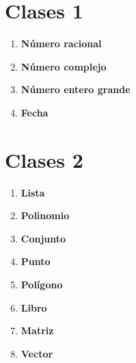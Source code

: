 \section{Clases 1}
\begin{enumerate}
    \item \textbf{Número racional}\\
    

    \item \textbf{Número complejo}\\
    

    \item \textbf{Número entero grande}\\
    

    \item \textbf{Fecha}\\
    
\end{enumerate}

\section{Clases 2}
\begin{enumerate}
    \item \textbf{Lista}\\
    
    
    \item \textbf{Polinomio}\\
    

    \item \textbf{Conjunto}\\
    

    \item \textbf{Punto}\\
    

    \item \textbf{Polígono}\\
    

    \item \textbf{Libro}\\
    

    \item \textbf{Matriz}\\
    
    
    \item \textbf{Vector}\\
    
\end{enumerate}